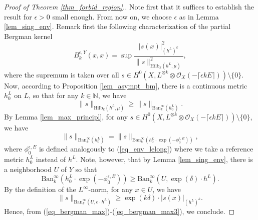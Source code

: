 \documentclass[12pt]{article}
\numberwithin{equation}{section}
\theoremstyle{theorem}
\theoremstyle{definition}
\theoremstyle{remark}
\newcommand{\nat}{\mathbb{N}}
\begin{document}
	\begin{proof}[Proof of Theorem \ref{thm_forbid_region}.]
		Note first that it suffices to establish the result for $\epsilon > 0$ small enough.
		From now on, we choose $\epsilon$ as in Lemma \ref{lem_sing_env}.
		Remark first the following characterization of the partial Bergman kernel
		\begin{equation}\label{eq_bergman_max}
			B_k^{\epsilon, Y}(x, x)
			=
			\sup \frac{|s(x)|_{(h^L)^k}^2}{\|s\|_{{\textrm{Hilb}}_k(h^L, \mu)}^2},
		\end{equation}
		where the supremum is taken over all $s \in H^0(X, L^{\otimes k} \otimes \mathscr{O}_X(- \lceil \epsilon k E \rceil)) \setminus \{0\}$.
		Now, according to Proposition \ref{lem_asympt_bm}, there is a continuous metric $h^L_0$ on $L$, so that for any $k \in \nat$, we have
		\begin{equation}\label{eq_bergman_max1}
			\|s\|_{{\textrm{Hilb}}_k(h^L, \mu)} 
			\geq
			\|s\|_{{\textrm{Ban}}_k^{\infty}(h^L_0)}.
		\end{equation}
		By Lemma \ref{lem_max_principl}, for any $s \in H^0(X, L^{\otimes k} \otimes \mathscr{O}_X(- \lceil \epsilon k E \rceil)) \setminus \{0\}$, we have
		\begin{equation}\label{eq_bergman_max2}
			\|s\|_{{\textrm{Ban}}_k^{\infty}(h^L_0)}
			=
			\|s\|_{{\textrm{Ban}}_k^{\infty}(h^L_0 \cdot \exp(-\phi^{\epsilon, E}_0))},
		\end{equation}
		where $\phi^{\epsilon, E}_0$ is defined analogously to (\ref{eq_env_lelong}) where we take a reference metric $h^L_0$ instead of $h^L$.
		Note, however, that by Lemma \ref{lem_sing_env}, there is a neighborhood $U$ of $Y$ so that 
		\begin{equation}\label{eq_bergman_max22}
			{\textrm{Ban}}_k^{\infty}(h^L_0 \cdot \exp(-\phi^{\epsilon, E}_0))
			\geq 
			{\textrm{Ban}}_k^{\infty}(U, \exp(\delta) \cdot h^L).
		\end{equation}
		By the definition of the $L^{\infty}$-norm, for any $x \in U$, we have
		\begin{equation}\label{eq_bergman_max3}
			\|s\|_{{\textrm{Ban}}_k^{\infty}(U, e \cdot h^L)}
			\geq
			\exp(k \delta) \cdot |s(x)|_{(h^L)^k}.
		\end{equation}
		Hence, from (\ref{eq_bergman_max})-(\ref{eq_bergman_max3}), we conclude.
	\end{proof}
	
\end{document}
